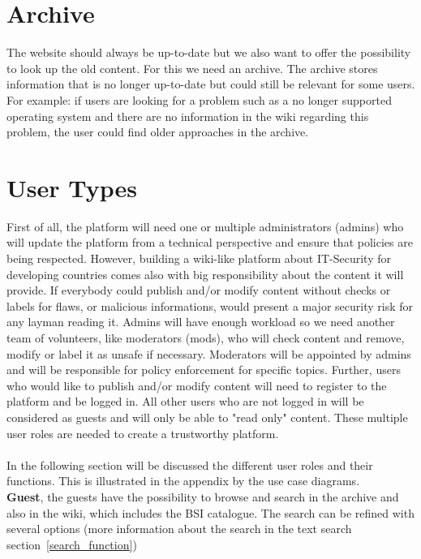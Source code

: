 \section{Archive}
\label{archive}
The website should always be up-to-date but we also want to offer the possibility to look up the old content.
For this we need an archive.
The archive stores information  that is no longer up-to-date but could still be relevant for some users. 
For example: if users are looking for a problem such as a no longer supported operating system and there are no information in the wiki regarding this problem, the user could find older approaches in the archive. 

\section{User Types} 
\label{user_types}
First of all, the platform will need one or multiple administrators (admins) who will update the platform from a technical perspective and ensure that policies are being respected. 
However, building a wiki-like platform about IT-Security for developing countries comes also with big responsibility about the content it will provide. 
If everybody could publish and/or modify content without checks or labels for flaws, or malicious informations, would present a major security risk for any layman reading it. 
Admins will have enough workload so we need another team of volunteers, like moderators (mods), who will check content and remove, modify or label it as unsafe if necessary. 
Moderators will be appointed by admins and will be responsible for policy enforcement for specific topics. 
Further, users who would like to publish and/or modify content will need to register to the platform and be logged in. 
All other users who are not logged in will be considered as guests and will only be able to "read only" content. 
These multiple user roles are needed to create a trustworthy platform. 
\\\\
In the following section will be discussed the different user roles and their functions. 
This is illustrated in the appendix by the use case diagrams. 
\\
\textbf{Guest}, the guests have the possibility to browse and search in the archive and also in the wiki, which includes the BSI catalogue. The search can be refined with several options (more information about the search in the text search section~\ref{search_function}) 
